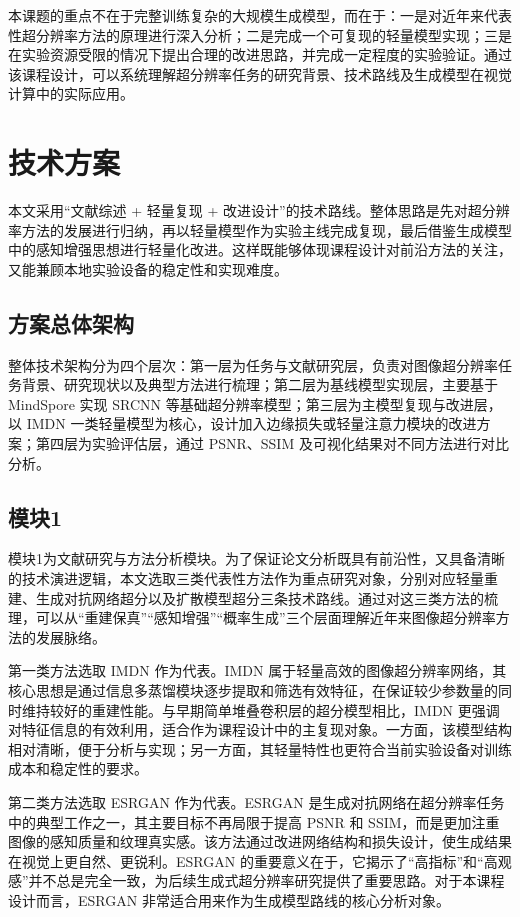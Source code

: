 \documentclass[bwprint]{report}
\begin{document}
本课题的重点不在于完整训练复杂的大规模生成模型，而在于：一是对近年来代表性超分辨率方法的原理进行深入分析；二是完成一个可复现的轻量模型实现；三是在实验资源受限的情况下提出合理的改进思路，并完成一定程度的实验验证。通过该课程设计，可以系统理解超分辨率任务的研究背景、技术路线及生成模型在视觉计算中的实际应用。

\section{技术方案}
本文采用“文献综述 + 轻量复现 + 改进设计”的技术路线。整体思路是先对超分辨率方法的发展进行归纳，再以轻量模型作为实验主线完成复现，最后借鉴生成模型中的感知增强思想进行轻量化改进。这样既能够体现课程设计对前沿方法的关注，又能兼顾本地实验设备的稳定性和实现难度。

\subsection{方案总体架构}
整体技术架构分为四个层次：第一层为任务与文献研究层，负责对图像超分辨率任务背景、研究现状以及典型方法进行梳理；第二层为基线模型实现层，主要基于 MindSpore 实现 SRCNN 等基础超分辨率模型；第三层为主模型复现与改进层，以 IMDN 一类轻量模型为核心，设计加入边缘损失或轻量注意力模块的改进方案；第四层为实验评估层，通过 PSNR、SSIM 及可视化结果对不同方法进行对比分析。

\subsection{模块1}
模块1为文献研究与方法分析模块。为了保证论文分析既具有前沿性，又具备清晰的技术演进逻辑，本文选取三类代表性方法作为重点研究对象，分别对应轻量重建、生成对抗网络超分以及扩散模型超分三条技术路线。通过对这三类方法的梳理，可以从“重建保真”“感知增强”“概率生成”三个层面理解近年来图像超分辨率方法的发展脉络。

第一类方法选取 IMDN 作为代表。IMDN 属于轻量高效的图像超分辨率网络，其核心思想是通过信息多蒸馏模块逐步提取和筛选有效特征，在保证较少参数量的同时维持较好的重建性能。与早期简单堆叠卷积层的超分模型相比，IMDN 更强调对特征信息的有效利用，适合作为课程设计中的主复现对象。一方面，该模型结构相对清晰，便于分析与实现；另一方面，其轻量特性也更符合当前实验设备对训练成本和稳定性的要求。

第二类方法选取 ESRGAN 作为代表。ESRGAN 是生成对抗网络在超分辨率任务中的典型工作之一，其主要目标不再局限于提高 PSNR 和 SSIM，而是更加注重图像的感知质量和纹理真实感。该方法通过改进网络结构和损失设计，使生成结果在视觉上更自然、更锐利。ESRGAN 的重要意义在于，它揭示了“高指标”和“高观感”并不总是完全一致，为后续生成式超分辨率研究提供了重要思路。对于本课程设计而言，ESRGAN 非常适合用来作为生成模型路线的核心分析对象。
\end{document}

